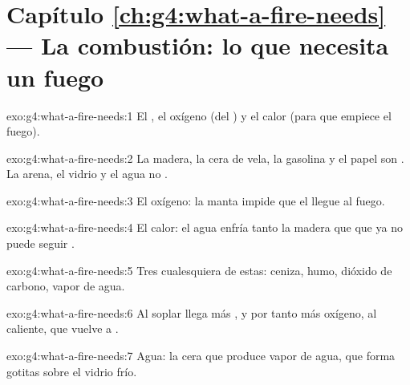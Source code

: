 \section*{Capítulo \ref{ch:g4:what-a-fire-needs} --- La combustión: lo que necesita un fuego}

\begin{solution}{exo:g4:what-a-fire-needs:1}
El , el oxígeno (del ) y el calor (para que empiece el
fuego).
\end{solution}

\begin{solution}{exo:g4:what-a-fire-needs:2}
La madera, la cera de vela, la gasolina y el papel son . La
arena, el vidrio y el agua no .
\end{solution}

\begin{solution}{exo:g4:what-a-fire-needs:3}
El oxígeno: la manta impide que el  llegue al fuego.
\end{solution}

\begin{solution}{exo:g4:what-a-fire-needs:4}
El calor: el agua enfría tanto la madera que  que ya no puede
seguir .
\end{solution}

\begin{solution}{exo:g4:what-a-fire-needs:5}
Tres cualesquiera de estas: ceniza, humo, dióxido de carbono, vapor de
agua.
\end{solution}

\begin{solution}{exo:g4:what-a-fire-needs:6}
Al soplar llega más , y por tanto más oxígeno, al 
caliente, que vuelve a .
\end{solution}

\begin{solution}{exo:g4:what-a-fire-needs:7}
Agua: la cera que  produce vapor de agua, que forma gotitas sobre el
vidrio frío.
\end{solution}

